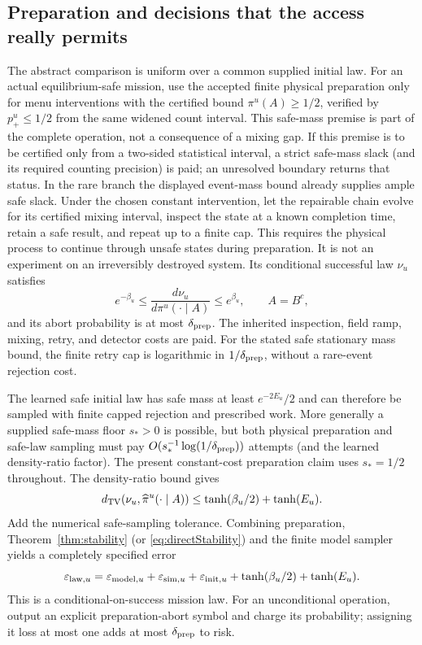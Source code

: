 \subsection{Preparation and decisions that the access really permits}
The abstract comparison is uniform over a common supplied initial law.
For an actual equilibrium-safe mission, use the accepted finite physical
preparation only for menu interventions with the certified bound
$\pi^u(A)\ge1/2$, verified by $p_+^u\le1/2$ from the same widened
count interval. This safe-mass premise is part of the complete operation,
not a consequence of a mixing gap. If this premise is to be certified
only from a two-sided statistical interval, a strict safe-mass slack
(and its required counting precision) is paid; an unresolved boundary
returns that status. In the rare branch the displayed event-mass bound
already supplies ample safe slack. Under the chosen constant intervention,
let the repairable
chain evolve for its certified mixing interval, inspect the state at a
known completion time, retain a safe result, and repeat up to a finite
cap. This requires the physical process to continue through unsafe
states during preparation. It is not an experiment on an irreversibly
destroyed system. Its conditional successful law $\nu_u$ satisfies
\begin{equation}
e^{-\beta_u}\le
\frac{d\nu_u}{d\pi^u(\cdot\mid A)}\le e^{\beta_u},
\qquad A=B^c,
\end{equation}
and its abort probability is at most $\delta_{\rm prep}$. The inherited
inspection, field ramp, mixing, retry, and detector costs are paid. For
the stated safe stationary mass bound, the finite retry cap is logarithmic
in $1/\delta_{\rm prep}$, without a rare-event rejection cost.

The learned safe initial law has safe mass at least $e^{-2E_u}/2$ and
can therefore be sampled with finite capped rejection and prescribed
work. More generally a supplied safe-mass floor $s_*>0$ is possible,
but both physical preparation and safe-law sampling must pay
$O(s_*^{-1}\log(1/\delta_{\rm prep}))$ attempts (and the learned
density-ratio factor). The present constant-cost preparation claim uses
$s_*=1/2$ throughout. The density-ratio bound gives
\begin{equation}
d_{\rm TV}(\nu_u,\widehat\pi^u(\cdot\mid A))
\le \tanh(\beta_u/2)+\tanh(E_u).
\label{eq:prepTV}
\end{equation}
Add the numerical safe-sampling tolerance. Combining preparation,
Theorem~\ref{thm:stability} (or \eqref{eq:directStability}) and the finite
model sampler yields a completely specified error
\begin{equation}
\varepsilon_{{\rm law},u}=
\varepsilon_{{\rm model},u}+\varepsilon_{{\rm sim},u}
+\varepsilon_{{\rm init},u}
+\tanh(\beta_u/2)+\tanh(E_u).
\label{eq:totalAcquiredTV}
\end{equation}
This is a conditional-on-success mission law. For an unconditional
operation, output an explicit preparation-abort symbol and charge its
probability; assigning it loss at most one adds at most
$\delta_{\rm prep}$ to risk.

